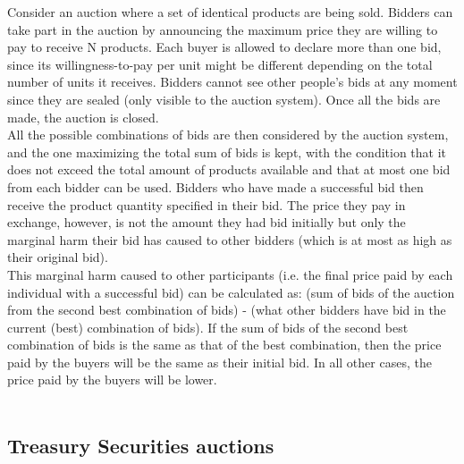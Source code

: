 \documentclass[a4paper]{article}
\begin{document}
Consider an auction where a set of identical products are being sold. Bidders can take part in the auction by announcing the maximum price they are willing to pay to receive N products. Each buyer is allowed to declare more than one bid, since its willingness-to-pay per unit might be different depending on the total number of units it receives. Bidders cannot see other people's bids at any moment since they are sealed (only visible to the auction system). Once all the bids are made, the auction is closed.
\\
All the possible combinations of bids are then considered by the auction system, and the one maximizing the total sum of bids is kept, with the condition that it does not exceed the total amount of products available and that at most one bid from each bidder can be used. Bidders who have made a successful bid then receive the product quantity specified in their bid. The price they pay in exchange, however, is not the amount they had bid initially but only the marginal harm their bid has caused to other bidders (which is at most as high as their original bid).
\\
This marginal harm caused to other participants (i.e. the final price paid by each individual with a successful bid) can be calculated as: (sum of bids of the auction from the second best combination of bids) - (what other bidders have bid in the current (best) combination of bids). If the sum of bids of the second best combination of bids is the same as that of the best combination, then the price paid by the buyers will be the same as their initial bid. In all other cases, the price paid by the buyers will be lower.
\\\\
\subsection*{Treasury Securities auctions}
\end{document}
